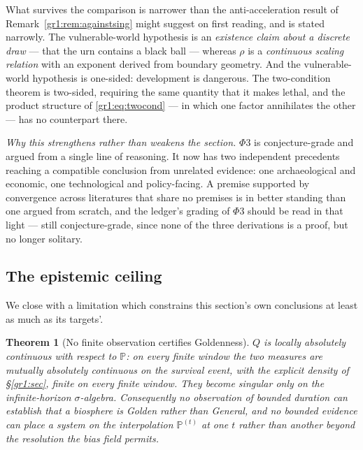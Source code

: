 \documentclass[11pt]{article}
\numberwithin{equation}{section}
\theoremstyle{plain}
\newtheorem{theorem}{Theorem}[section]
\theoremstyle{definition}
\theoremstyle{remark}
\newcommand{\PP}{\mathbb{P}}
\begin{document}
What survives the comparison is narrower than the anti-acceleration
result of Remark~\ref{gr1:rem:againstsing} might suggest on first
reading, and is stated narrowly. The vulnerable-world hypothesis is an
\emph{existence claim about a discrete draw} --- that the urn contains a
black ball --- whereas $\rho$ is a \emph{continuous scaling relation}
with an exponent derived from boundary geometry. And the vulnerable-world
hypothesis is one-sided: development is dangerous. The two-condition
theorem is two-sided, requiring the same quantity that it makes lethal,
and the product structure of \eqref{gr1:eq:twocond} --- in which one
factor annihilates the other --- has no counterpart there.

\emph{Why this strengthens rather than weakens the section.} $\Phi3$ is
conjecture-grade and argued from a single line of reasoning. It now has
two independent precedents reaching a compatible conclusion from
unrelated evidence: one archaeological and economic, one
technological and policy-facing. A premise supported by convergence
across literatures that share no premises is in better standing than one
argued from scratch, and the ledger's grading of $\Phi3$ should be read
in that light --- still conjecture-grade, since none of the three
derivations is a proof, but no longer solitary.

\subsection{The epistemic ceiling}\label{gr:sub:ceiling}

We close with a limitation which constrains this section's own
conclusions at least as much as its targets'.

\begin{theorem}[No finite observation certifies Goldenness]
\label{gr:thm:ceiling}
$Q$ is locally absolutely continuous with respect to $\PP$: on every
finite window the two measures are mutually absolutely continuous on the
survival event, with the explicit density of \S\ref{gr1:sec}, finite on
every finite window. They
become singular only on the infinite-horizon $\sigma$-algebra.
Consequently no observation of bounded duration can establish that a
biosphere is Golden rather than General, and no bounded evidence can
place a system on the interpolation $\PP^{(t)}$ at one $t$ rather than
another beyond the resolution the bias field permits.
\end{theorem}
\end{document}
